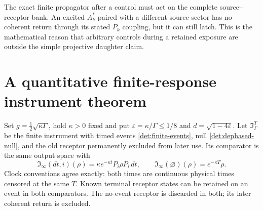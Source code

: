 \documentclass[11pt,oneside,openany]{book}
\theoremstyle{definition}
\theoremstyle{remark}\newtheorem{remark}[theorem]{Remark}
\begin{document}
The exact finite propagator after a control must act on the complete
source--receptor bank. An excited $A_k^*$ paired with a different
source sector has no coherent return through its stated $P_k$
coupling, but it can still latch. This is the mathematical reason that
arbitrary controls during a retained exposure are outside the simple
projective daughter claim.

\section{A quantitative finite-response instrument theorem}

Set $g=\tfrac12\sqrt{\kappa\Gamma}$, hold $\kappa>0$ fixed and put
$\varepsilon=\kappa/\Gamma\le1/8$ and $d=\sqrt{1-4\varepsilon}$.
Let $\mathfrak I_\Gamma^T$ be the finite instrument with timed events
\eqref{det:finite-events}, null \eqref{det:dephased-null}, and the
old receptor permanently excluded from later use. Its comparator is
the same output space with
\begin{equation}
 \mathfrak I_\infty(dt,i)(\rho)=\kappa e^{-\kappa t}P_i\rho P_i\,dt,
 \qquad \mathfrak I_\infty(\varnothing)(\rho)=e^{-\kappa T}\rho.
                                                        \label{det:latch-limit}
\end{equation}
Clock conventions agree exactly: both times are continuous physical
times censored at the same $T$. Known terminal receptor states can be
retained on an event in both comparators. The no-event receptor is
discarded in both; its later coherent return is excluded.
\end{document}
